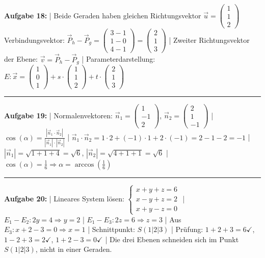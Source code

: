 \documentclass[12pt,a4paper]{article}
\newcommand{\vek}[1]{\vec{#1}}
\begin{document}
\textbf{Aufgabe 18:} |
Beide Geraden haben gleichen Richtungsvektor $\vek{u} = \begin{pmatrix}1\\1\\2\end{pmatrix}$ \\
Verbindungsvektor: $\vek{P}_h - \vek{P}_g = \begin{pmatrix}3-1\\1-0\\4-1\end{pmatrix} = \begin{pmatrix}2\\1\\3\end{pmatrix}$ |
Zweiter Richtungsvektor der Ebene: $\vek{v} = \vek{P}_h - \vek{P}_g$ |
Parameterdarstellung: $E: \vek{x} = \begin{pmatrix}1\\0\\1\end{pmatrix} + s \cdot \begin{pmatrix}1\\1\\2\end{pmatrix} + t \cdot \begin{pmatrix}2\\1\\3\end{pmatrix}$
\begin{center}\rule{0.8\linewidth}{0.4pt}\end{center}

\textbf{Aufgabe 19:} |
Normalenvektoren: $\vek{n}_1 = \begin{pmatrix}1\\-1\\2\end{pmatrix}$, $\vek{n}_2 = \begin{pmatrix}2\\1\\-1\end{pmatrix}$ |
$\cos(\alpha) = \frac{|\vek{n}_1 \cdot \vek{n}_2|}{|\vek{n}_1| \cdot |\vek{n}_2|}$ |
$\vek{n}_1 \cdot \vek{n}_2 = 1\cdot2 + (-1)\cdot1 + 2\cdot(-1) = 2 - 1 - 2 = -1$ |
$|\vek{n}_1| = \sqrt{1+1+4} = \sqrt{6}$, $|\vek{n}_2| = \sqrt{4+1+1} = \sqrt{6}$ |
$\cos(\alpha) = \frac{1}{6} \Rightarrow \alpha = \arccos(\frac{1}{6})$
\begin{center}\rule{0.8\linewidth}{0.4pt}\end{center}

\textbf{Aufgabe 20:} |
Lineares System lösen:
$\begin{cases} x + y + z = 6 \\ x - y + z = 2 \\ x + y - z = 0 \end{cases}$ |
$E_1 - E_2: 2y = 4 \Rightarrow y = 2$ |
$E_1 - E_3: 2z = 6 \Rightarrow z = 3$ |
Aus $E_3: x + 2 - 3 = 0 \Rightarrow x = 1$ |
Schnittpunkt: $S(1|2|3)$ |
Prüfung: $1+2+3=6 \checkmark$, $1-2+3=2 \checkmark$, $1+2-3=0 \checkmark$ |
Die drei Ebenen schneiden sich im Punkt $S(1|2|3)$, nicht in einer Geraden.
\end{document}
